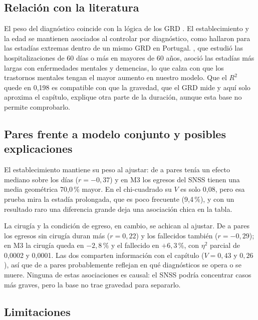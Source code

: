 \documentclass[10.5pt,a4paper,headings=small,abstract=false,bibliography=totoc,listof=totoc]{scrartcl}
\newcommand{\pct}{\,\%}
\begin{document}
\subsection{Relación con la literatura}

El peso del diagnóstico coincide con la lógica de los GRD \citep{fetter1980}. El establecimiento y la edad se mantienen asociados al controlar por diagnóstico, como hallaron \citet{freitas2012} para las estadías extremas dentro de un mismo GRD en Portugal. \citet{olivares2020}, que estudió las hospitalizaciones de 60 días o más en mayores de 60 años, asoció las estadías más largas con enfermedades mentales y demencias, lo que calza con que los trastornos mentales tengan el mayor aumento en nuestro modelo. Que el $R^2$ quede en 0,198 es compatible con que la gravedad, que el GRD mide y aquí solo aproxima el capítulo, explique otra parte de la duración, aunque esta base no permite comprobarlo.

\subsection{Pares frente a modelo conjunto y posibles explicaciones}

El establecimiento mantiene su peso al ajustar: de a pares tenía un efecto mediano sobre los días ($r=-0{,}37$) y en M3 los egresos del SNSS tienen una media geométrica 70,0\pct{} mayor. En el chi-cuadrado su $V$ es solo 0,08, pero esa prueba mira la estadía prolongada, que es poco frecuente (9,4\pct{}), y con un resultado raro una diferencia grande deja una asociación chica en la tabla.

La cirugía y la condición de egreso, en cambio, se achican al ajustar. De a pares los egresos sin cirugía duran más ($r=0{,}22$) y los fallecidos también ($r=-0{,}29$); en M3 la cirugía queda en $-2{,}8\pct{}$ y el fallecido en $+6{,}3\pct{}$, con $\eta^2$ parcial de 0,0002 y 0,0001. Las dos comparten información con el capítulo ($V=0{,}43$ y $0{,}26$), así que de a pares probablemente reflejan en qué diagnósticos se opera o se muere. Ninguna de estas asociaciones es causal: el SNSS podría concentrar casos más graves, pero la base no trae gravedad para separarlo.

\subsection{Limitaciones}
\end{document}
